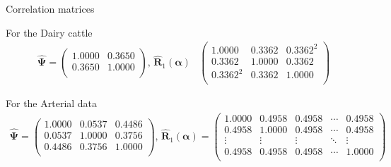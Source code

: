 \documentclass[t,9pt]{beamer}
\begin{document}
\begin{frame}[fragile]{Correlation matrices}

\begin{block}{For the Dairy cattle}
\begin{align*}
    \hat{\pmb{\Psi}}=\begin{pmatrix}
 1.0000 & 0.3650 \\ 
 0.3650 & 1.0000 \\ 
        \end{pmatrix}, \,
   \pmb{\hat{R}}_1(\pmb{\alpha}) & \begin{pmatrix}
1.0000 & 0.3362 & 0.3362^2 \\ 
0.3362 & 1.0000 & 0.3362 \\ 
0.3362^2 &0.3362 & 1.0000 \\
        \end{pmatrix}
\end{align*}   
\end{block}
\begin{block}{For the Arterial data}
\scriptsize
\begin{align*}
    \hat{\pmb{\Psi}}=\begin{pmatrix}
1.0000 & 0.0537 & 0.4486 \\ 
 0.0537 & 1.0000 & 0.3756 \\ 
0.4486 & 0.3756 & 1.0000 \\ 
        \end{pmatrix} ,\,
   \pmb{\hat{R}}_1(\pmb{\alpha}) =\begin{pmatrix}
 1.0000 & 0.4958 & 0.4958 & \cdots& 0.4958 \\ 
  0.4958 & 1.0000 & 0.4958 &\cdots & 0.4958 \\ 
 \vdots & \vdots & \vdots & \ddots & \vdots \\ 
  0.4958 & 0.4958 & 0.4958 & \cdots& 1.0000 \\
        \end{pmatrix}
\end{align*}
\end{block}
\end{frame}
\end{document}
